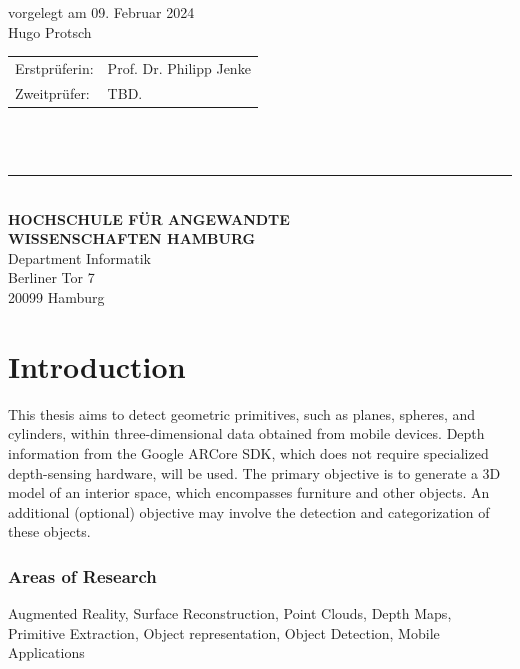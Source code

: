 \begin{titlepage}
  vorgelegt am 09. Februar 2024\\
  Hugo Protsch

  \vspace{5cm}

  \hspace*{37mm}
  \begin{minipage}{0.5\linewidth}
    \begin{tabular}{@{}ll}
      Erstprüferin: & Prof. Dr. Philipp Jenke\\[-.3mm]
      Zweitprüfer: & TBD. \\
    \end{tabular}\\

    \,\rule{9mm}{1mm}\\[1.5mm]

    \textbf{HOCHSCHULE FÜR ANGEWANDTE}\\
    \textbf{WISSENSCHAFTEN HAMBURG}\\
    Department Informatik\\
    Berliner Tor 7\\
    20099 Hamburg
  \end{minipage}
\end{titlepage}
\restoregeometry

\thispagestyle{empty}


\chapter*{Introduction}
This thesis aims to detect geometric primitives, such as planes, spheres, and cylinders,
within three-dimensional data obtained from mobile devices.
Depth information from the Google ARCore SDK, which does not require specialized depth-sensing hardware, will be used.
The primary objective is to generate a 3D model of an interior space, which encompasses furniture and other objects.
An additional (optional) objective may involve the detection and categorization of these objects.

\subsection*{Areas of Research}
Augmented Reality, Surface Reconstruction, Point Clouds, Depth Maps, Primitive Extraction, Object representation, Object Detection, Mobile Applications



